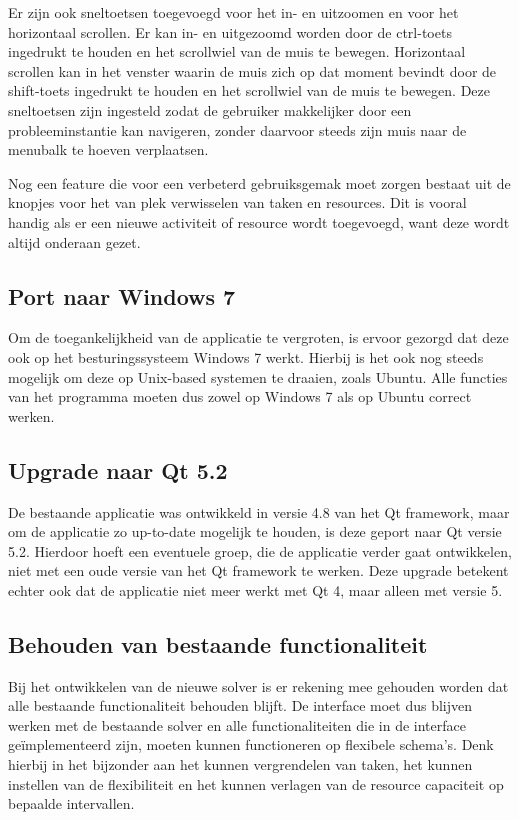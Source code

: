 Er zijn ook sneltoetsen toegevoegd voor het in- en uitzoomen en voor het horizontaal scrollen. Er kan in- en uitgezoomd worden door de ctrl-toets ingedrukt te houden en het scrollwiel van de muis  te bewegen. Horizontaal scrollen kan in het venster waarin de muis zich op dat moment bevindt door de shift-toets ingedrukt te houden en het scrollwiel van de muis te bewegen. Deze sneltoetsen zijn ingesteld zodat de gebruiker makkelijker door een probleeminstantie kan navigeren, zonder daarvoor steeds zijn muis naar de menubalk te hoeven verplaatsen.

Nog een feature die voor een verbeterd gebruiksgemak moet zorgen bestaat uit de knopjes voor het van plek verwisselen van taken en resources. Dit is vooral handig als er een nieuwe activiteit of resource wordt toegevoegd, want deze wordt altijd onderaan gezet. 

\subsection{Port naar Windows 7}
Om de toegankelijkheid van de applicatie te vergroten, is ervoor gezorgd dat deze ook op het besturingssysteem Windows 7 werkt. Hierbij is het ook nog steeds mogelijk om deze op Unix-based systemen te draaien, zoals Ubuntu. Alle functies van het programma moeten dus zowel op Windows 7 als op Ubuntu correct werken.

\subsection{Upgrade naar Qt 5.2}
De bestaande applicatie was ontwikkeld in versie 4.8 van het Qt framework, maar om de applicatie zo up-to-date mogelijk te houden, is deze geport naar Qt versie 5.2. Hierdoor hoeft een eventuele groep, die de applicatie verder gaat ontwikkelen, niet met een oude versie van het Qt framework te werken. Deze upgrade betekent echter ook dat de applicatie niet meer werkt met Qt 4, maar alleen met versie 5.

\subsection{Behouden van bestaande functionaliteit}
Bij het ontwikkelen van de nieuwe solver is er rekening mee gehouden worden dat alle bestaande functionaliteit behouden blijft. De interface moet dus blijven werken met de bestaande solver en alle functionaliteiten die in de interface ge\"implementeerd zijn, moeten kunnen functioneren op flexibele schema's. Denk hierbij in het bijzonder aan het kunnen vergrendelen van taken, het kunnen instellen van de flexibiliteit en het kunnen verlagen van de resource capaciteit op bepaalde intervallen.
